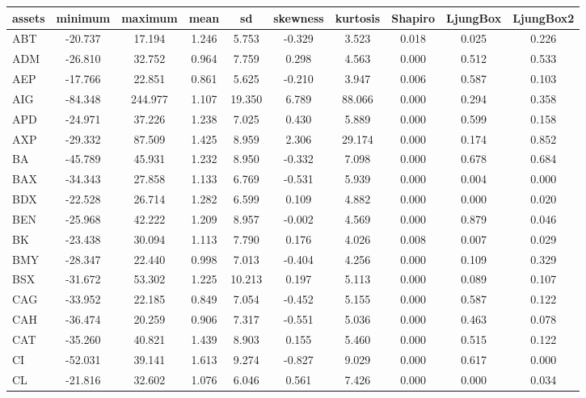\begin{table}

\begin{tabular}{l|c|c|c|c|c|c|c|c|c}
\hline
assets & minimum & maximum & mean & sd & skewness & kurtosis & Shapiro & LjungBox & LjungBox2\\
\hline
ABT & -20.737 & 17.194 & 1.246 & 5.753 & -0.329 & 3.523 & 0.018 & 0.025 & 0.226\\
\hline
ADM & -26.810 & 32.752 & 0.964 & 7.759 & 0.298 & 4.563 & 0.000 & 0.512 & 0.533\\
\hline
AEP & -17.766 & 22.851 & 0.861 & 5.625 & -0.210 & 3.947 & 0.006 & 0.587 & 0.103\\
\hline
AIG & -84.348 & 244.977 & 1.107 & 19.350 & 6.789 & 88.066 & 0.000 & 0.294 & 0.358\\
\hline
APD & -24.971 & 37.226 & 1.238 & 7.025 & 0.430 & 5.889 & 0.000 & 0.599 & 0.158\\
\hline
AXP & -29.332 & 87.509 & 1.425 & 8.959 & 2.306 & 29.174 & 0.000 & 0.174 & 0.852\\
\hline
BA & -45.789 & 45.931 & 1.232 & 8.950 & -0.332 & 7.098 & 0.000 & 0.678 & 0.684\\
\hline
BAX & -34.343 & 27.858 & 1.133 & 6.769 & -0.531 & 5.939 & 0.000 & 0.004 & 0.000\\
\hline
BDX & -22.528 & 26.714 & 1.282 & 6.599 & 0.109 & 4.882 & 0.000 & 0.000 & 0.020\\
\hline
BEN & -25.968 & 42.222 & 1.209 & 8.957 & -0.002 & 4.569 & 0.000 & 0.879 & 0.046\\
\hline
BK & -23.438 & 30.094 & 1.113 & 7.790 & 0.176 & 4.026 & 0.008 & 0.007 & 0.029\\
\hline
BMY & -28.347 & 22.440 & 0.998 & 7.013 & -0.404 & 4.256 & 0.000 & 0.109 & 0.329\\
\hline
BSX & -31.672 & 53.302 & 1.225 & 10.213 & 0.197 & 5.113 & 0.000 & 0.089 & 0.107\\
\hline
CAG & -33.952 & 22.185 & 0.849 & 7.054 & -0.452 & 5.155 & 0.000 & 0.587 & 0.122\\
\hline
CAH & -36.474 & 20.259 & 0.906 & 7.317 & -0.551 & 5.036 & 0.000 & 0.463 & 0.078\\
\hline
CAT & -35.260 & 40.821 & 1.439 & 8.903 & 0.155 & 5.460 & 0.000 & 0.515 & 0.122\\
\hline
CI & -52.031 & 39.141 & 1.613 & 9.274 & -0.827 & 9.029 & 0.000 & 0.617 & 0.000\\
\hline
CL & -21.816 & 32.602 & 1.076 & 6.046 & 0.561 & 7.426 & 0.000 & 0.000 & 0.034\\

\end{tabular}
\end{table}
